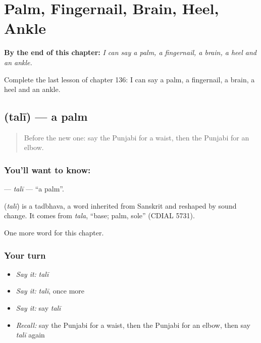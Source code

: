 
\chapter{Palm, Fingernail, Brain, Heel, Ankle}
\label{ch:pa-palm-fingernail-brain-heel-ankle}

\begin{chapteropening}
\textbf{By the end of this chapter:} \emph{I can say a palm, a fingernail, a brain, a heel and an ankle.}

Complete the last lesson of chapter 136: I can say a palm, a fingernail, a brain, a heel and an ankle.
\end{chapteropening}

\section[\texorpdfstring{\pa{ਤਲੀ} (talī)}{ਤਲੀ (talī)}]{ (talī) — a palm}

\label{lesson:PA-C136-tali}



\begin{quote}
Before the new one: say the Punjabi for a waist, then the Punjabi for an elbow.
\end{quote}

\subsection*{You'll want to know: }
\textbf{} — \emph{talī} — \textquotedblleft{}a palm\textquotedblright{}.

\begin{cousinweb}
\textbf{} (\emph{talī}) is a tadbhava, a word inherited from Sanskrit and reshaped by sound change. It comes from \emph{tala}, \textquotedblleft{}base; palm, sole\textquotedblright{} (CDIAL 5731).
\end{cousinweb}

\begin{grammarlens}[title={What you've built}]
One more word for this chapter.
\end{grammarlens}

\subsection*{Your turn}
\begin{itemize}
\raggedright
  \item \emph{Say it:} \emph{talī}
  \item \emph{Say it:} \emph{talī}, once more
  \item \emph{Say it:} say \emph{talī}
  \item \emph{Recall:} say the Punjabi for a waist, then the Punjabi for an elbow, then say \emph{talī} again
\end{itemize}

